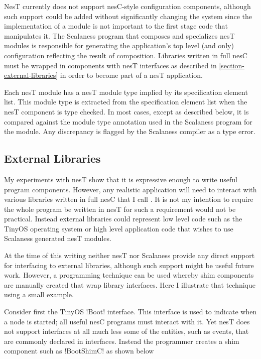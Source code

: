 NesT currently does not support nesC-style configuration components, although such support could
be added without significantly changing the system since the implementation of a module is not
important to the first stage code that manipulates it. The Scalaness program that composes and
specializes nesT modules is responsible for generating the application's top level (and only)
configuration reflecting the result of composition. Libraries written in full nesC must be
wrapped in components with nesT interfaces as described in \autoref{section-external-libraries}
in order to become part of a nesT application.

Each nesT module has a nesT module type implied by its specification element list. This module
type is extracted from the specification element list when the nesT component is type checked.
In most cases, except as described below, it is compared against the module type annotation used
in the Scalaness program for the module. Any discrepancy is flagged by the Scalaness compiler as
a type error.

\subsection{External Libraries}
\label{section-external-libraries}

My experiments with nesT show that it is expressive enough to write useful program components.
However, any realistic application will need to interact with various libraries written in full
nesC that I call . It is not my intention to require the whole
program be written in nesT for such a requirement would not be practical. Instead external
libraries could represent low level code such as the TinyOS operating system or high level
application code that wishes to use Scalaness generated nesT modules.

At the time of this writing neither nesT nor Scalaness provide any direct support for
interfacing to external libraries, although such support might be useful future work. However, a
programming technique can be used whereby shim components are manually created that wrap library
interfaces. Here I illustrate that technique using a small example.

Consider first the TinyOS !Boot! interface. This interface is used to indicate when a node is
started; all useful nesC programs must interact with it. Yet nesT does not support interfaces at
all much less some of the entities, such as events, that are commonly declared in interfaces.
Instead the programmer creates a shim component such as !BootShimC! as shown below

